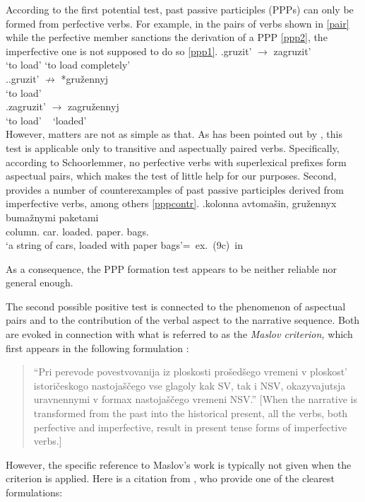 According to the first potential test, past passive participles (PPPs) can only be formed from perfective verbs. For example, in the pairs of verbs shown in \ref{pair} while the perfective member sanctions the derivation of a PPP \ref{ppp2}, the imperfective one is not supposed to do so \ref{ppp1}.
\exg.\label{pair}{gruzit'\textsuperscript{\IPF}} {$\rightarrow$} zagruzit'\textsuperscript{\PF}\\
{`to load'} {} {`to load completely'}\\

\ex.\ag.\label{ppp1}gruzit'\textsuperscript{\IPF} $\nrightarrow$ *gru\v{z}ennyj\\
{`to load'} {~} {~}\\
\bg.\label{ppp2}zagruzit'\textsuperscript{\PF} {$\rightarrow$} zagru\v{z}ennyj\\
{`to load'} {~} {`loaded'}\\

However, matters are not as simple as that. As has been pointed out by \citet{Schoorlemmer:95}, this test is applicable only to transitive and aspectually paired verbs. Specifically, according to Schoorlemmer, no perfective verbs with superlexical prefixes form aspectual pairs, which makes the test of little help for our purposes. Second, \citet{Romanova:06} provides a number of counterexamples of past passive participles derived from imperfective verbs, among others \ref{pppcontr}.
\exg.\label{pppcontr}kolonna avtoma\v{s}in, gru\v{z}ennyx buma\v{z}nymi paketami \\
column. car. loaded. paper. bags.\\
\trans `a string of cars, loaded with paper bags'\hfill\hbox{= ex. (9c) in \citet[5]{Romanova:06}}

As a consequence, the PPP formation test appears to be neither reliable nor general enough.

The second possible positive test is connected to the phenomenon of aspectual pairs and to the contribution of the verbal aspect to the narrative sequence. Both are evoked in connection with what is referred to as the \textit{Maslov criterion,} which first appears in the following formulation \citep[][76--77]{Maslov:04}: 
\begin{quote}
``Pri perevode povestvovanija iz ploskosti pro\v{s}ed\v{s}ego vremeni v ploskost' istori\v{c}eskogo nastoja\v{s}\v{c}ego vse glagoly kak SV, tak i NSV, okazyvajutsja uravnennymi v formax nastoja\v{s}\v{c}ego vremeni NSV.'' [When the narrative is transformed from the past into the historical present, all the verbs, both perfective and imperfective, result in present tense forms of imperfective verbs.] 
\end{quote}
However, the specific reference to Maslov's work is typically not given when the criterion is applied. Here is a citation from \citet[1]{Mikaelian:07}, who provide one of the clearest formulations:

